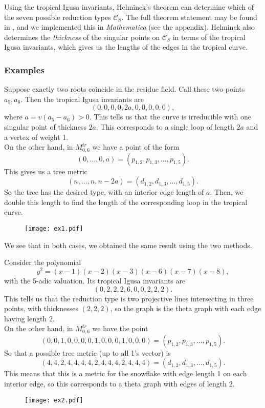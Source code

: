 Using the tropical Igusa invariants, Helminck's theorem can determine which of the seven possible reduction types $\mathcal{C}_S$. The full theorem statement may be found in \cite{masters}, and we implemented this in \emph{Mathematica} (see the appendix). Helminck also determines the \emph{thickness} of the singular points on $\mathcal{C}_S$ in terms of the tropical Igusa invariants, which gives us the lengths of the edges in the tropical curve.

\subsubsection{Examples}

\label{example1}

Suppose exactly two roots coincide in the residue field.
Call these two points $a_5,a_6$. Then the tropical Igusa invariants are
$$
(0, 0, 0, 0, 2a, 0, 0, 0, 0, 0),
$$
where $a = v(a_5-a_6)>0$.
This tells us that the curve is irreducible with one singular point of thickness $2a$. This corresponds to a single loop of length $2a$ and a vertex of weight 1. \\

On the other hand, in $M_{0,6}^{tr}$ we have a point of the form
$$
(0,\ldots,0,a)=(p_{1,2}, p_{1,3}, \ldots, p_{1,5}).
$$
 This gives us a tree metric
$$
(n,\ldots, n, n-2a)=(d_{1,2}, d_{1,3}, \ldots, d_{1,5}).
$$
So the tree has the desired type, with an interior edge length of $a$. Then, we double this length to find the length of the corresponding loop in the tropical curve.
 \begin{figure}[h]
\centering
  \texttt{[image: ex1.pdf]}
\end{figure}

We see that in both cases, we obtained the same result using the two methods.
 
 
 

Consider the polynomial
$$
y^2 = (x-1)(x-2)(x-3)(x-6)(x-7)(x-8),
$$
with the 5-adic valuation.
Its tropical Igusa invariants are
$$(0, 2, 2, 2, 6, 0, 0, 2, 2, 2).$$
 This tells us that the reduction type is two projective lines intersecting in three points, with thicknesses $(2,2,2)$, so the graph is the theta graph with each edge having length 2.\\

On the other hand, in $M_{0,6}^{tr}$ we have the point
$$
(0, 0, 1, 0, 0, 0, 0, 1, 0, 0, 0, 1, 0, 0, 0) = (p_{1,2}, p_{1,3}, \ldots, p_{1,5}).
$$
So that a possible tree metric (up to all 1's vector) is
$$
(4, 4, 2, 4, 4, 4, 4, 2, 4, 4, 4, 2, 4, 4, 4) =  (d_{1,2}, d_{1,3}, \ldots, d_{1,5}).
$$
This means that this is a metric for the snowflake with edge length 1 on each interior edge, so this corresponds to a theta graph with edges of length 2.


 \begin{figure}[h]
\centering
  \texttt{[image: ex2.pdf]}
\end{figure}

